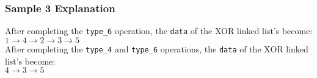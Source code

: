 \subsubsection{Sample 3 Explanation}\label{sample-3-explanation}

After completing the \texttt{type\_6} operation, the \texttt{data} of the XOR linked list's become: \\
$1\rightarrow 4\rightarrow 2\rightarrow 3\rightarrow 5$ \\
After completing the \texttt{type\_4} and \texttt{type\_6} operations, the \texttt{data} of the XOR linked list's become: \\
$4\rightarrow 3\rightarrow 5$